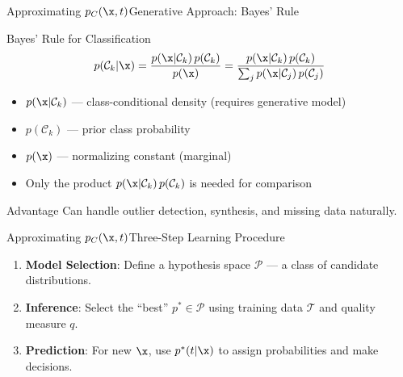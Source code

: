 \begin{frame}{Approximating $p_C(\x, t)$}{Generative Approach: Bayes' Rule}
  \begin{block}{Bayes' Rule for Classification}
    \[
      p(\mathcal{C}_k|\x) = \frac{p(\x|\mathcal{C}_k)\,p(\mathcal{C}_k)}{p(\x)} = \frac{p(\x|\mathcal{C}_k)\,p(\mathcal{C}_k)}{\sum_j p(\x|\mathcal{C}_j)\,p(\mathcal{C}_j)}
    \]
  \end{block}

  \begin{itemize}
    \item $p(\x|\mathcal{C}_k)$ — class-conditional density (requires generative model)
    \item $p(\mathcal{C}_k)$ — prior class probability
    \item $p(\x)$ — normalizing constant (marginal)
    \item Only the product $p(\x|\mathcal{C}_k)\,p(\mathcal{C}_k)$ is needed for comparison
  \end{itemize}

  \begin{exampleblock}{Advantage}
    Can handle outlier detection, synthesis, and missing data naturally.
  \end{exampleblock}
\end{frame}

\begin{frame}{Approximating $p_C(\x, t)$}{Three-Step Learning Procedure}
  \begin{enumerate}
    \item[\textbf{1.}] \textbf{Model Selection}: Define a hypothesis space $\mathcal{P}$ — a class of candidate distributions.
    \item[\textbf{2.}] \textbf{Inference}: Select the ``best'' $p^* \in \mathcal{P}$ using training data $\mathcal{T}$ and quality measure $q$.
    \item[\textbf{3.}] \textbf{Prediction}: For new $\x$, use $p^*(t|\x)$ to assign probabilities and make decisions.
  \end{enumerate}

  \bigskip
  \begin{center}
  \end{center}
\end{frame}

